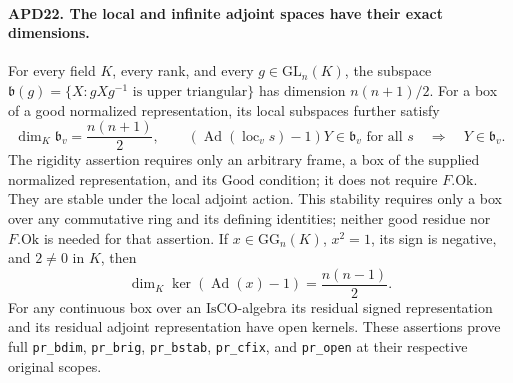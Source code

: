 \paragraph{APD22. The local and infinite adjoint spaces have their exact dimensions.}
\label{claim:APD22}
For every field \(K\), every rank, and every
\(g\in\mathrm{GL}_n(K)\), the subspace
\(\mathfrak b(g)=\{X:gXg^{-1}\text{ is upper triangular}\}\)
has dimension \(n(n+1)/2\).  For a box of a good normalized
representation, its local subspaces further satisfy
\[
 \dim_K\mathfrak b_v=\frac{n(n+1)}2,
 \qquad
 (\operatorname{Ad}(\operatorname{loc}_v s)-1)Y\in\mathfrak b_v
 \text{ for all }s\quad\Longrightarrow\quad Y\in\mathfrak b_v.
                                                               \tag{APD.42}
\]
The rigidity assertion requires only an arbitrary frame, a box
of the supplied normalized representation, and its
\(\mathrm{Good}\) condition; it does not require
\(F.\mathrm{Ok}\).  They are stable under the local adjoint
action.  This stability
requires only a box over any commutative ring and its defining
identities; neither good residue nor \(F.\mathrm{Ok}\) is
needed for that assertion.  If
\(x\in\mathrm{GG}_n(K)\), \(x^2=1\), its sign is negative,
and \(2\ne0\) in \(K\), then
\[
            \dim_K\ker(\operatorname{Ad}(x)-1)
                              =\frac{n(n-1)}2.            \tag{APD.43}
\]
For any continuous box over an \(\mathrm{IsCO}\)-algebra its
residual signed representation and its residual adjoint
representation have open kernels.  These assertions prove full
\texttt{pr\_bdim}, \texttt{pr\_brig}, \texttt{pr\_bstab},
\texttt{pr\_cfix}, and \texttt{pr\_open} at their respective
original scopes.

